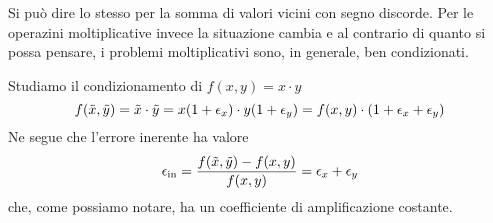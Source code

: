 Si può dire lo stesso per la somma di valori vicini con segno discorde. Per le operazini moltiplicative invece
la situazione cambia e al contrario di quanto si possa pensare, i problemi moltiplicativi sono, in generale,
ben condizionati.

\begin{example}
	Studiamo il condizionamento di $f(x, y) = x\cdot y$
	\[
		f(\tilde{x}, \tilde{y}) = \tilde{x} \cdot \tilde{y} = x (1 + \epsilon_x) \cdot y (1 + \epsilon_y) =
		f(x, y) \cdot (1 + \epsilon_x + \epsilon_y)
	\]
	Ne segue che l'errore inerente ha valore
	\[ \epsilon_\text{in} = \frac{f(\tilde{x}, \tilde{y}) - f(x, y)}{f(x, y)} = \epsilon_x + \epsilon_y \]
	che, come possiamo notare, ha un coefficiente di amplificazione costante.
\end{example}